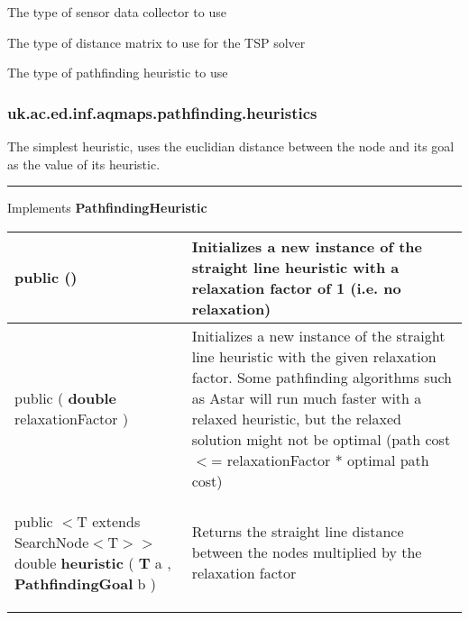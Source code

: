  {\scriptsize The type of sensor data collector to use
 
\label{tab:SensorDataCollectorFactory.CollectorType}
}
 {\scriptsize The type of distance matrix to use for the TSP solver
 
\label{tab:SensorDataCollectorFactory.DistanceMatrixType}
}
 {\scriptsize The type of pathfinding heuristic to use
 
\label{tab:SensorDataCollectorFactory.PathfindingHeuristicType}
}
\subsubsection*{ uk.ac.ed.inf.aqmaps.pathfinding.heuristics }
 {\scriptsize The simplest heuristic, uses the euclidian distance between the node and its goal as the value of its heuristic.
 
\vspace*{4pt} \hrule \vspace*{3pt}
Implements \textbf{ PathfindingHeuristic }
\vspace*{-5pt} 
\begin{tabularx}{\linewidth}{m{}|m{}}
\label{tab:StraightLineDistance}
\begin{raggedleft}public  \textbf{\hyperref[tab:StraightLineDistance]{\color{blue}{StraightLineDistance}}}()
\end{raggedleft} &
 Initializes a new instance of the straight line heuristic with a relaxation factor of 1 (i.e. no relaxation)\\ \hline 
\begin{raggedleft}public  \textbf{\hyperref[tab:StraightLineDistance]{\color{blue}{StraightLineDistance}} }(\hspace*{ 5pt} \textbf{double} relaxationFactor  )
\end{raggedleft} &
 Initializes a new instance of the straight line heuristic with the given relaxation factor. Some pathfinding algorithms such as Astar will run much faster \newline%
 with a relaxed heuristic, but the relaxed solution might not be optimal (path cost $<$= relaxationFactor * optimal path cost)\\ \hline 
\begin{raggedleft}public $<$T extends SearchNode$<$T$>$$>$ double \textbf{heuristic }(\newline \hfill 
\hspace*{ 5pt} \textbf{T} a , \newline
 \hspace*{ 5pt} \textbf{PathfindingGoal} b  )
\end{raggedleft} &
 Returns the straight line distance between the nodes multiplied by the relaxation factor\\\end{tabularx}
}
